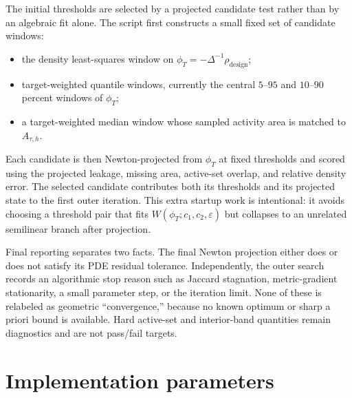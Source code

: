\documentclass[11pt]{article}
\begin{document}
The initial thresholds are selected by a projected candidate test rather than
by an algebraic fit alone.  The script first constructs a small fixed set of
candidate windows:
\begin{itemize}[leftmargin=2em]
\item the density least-squares window on $\phi_T=-\Delta^{-1}\rho_{\mathrm{design}}$;
\item target-weighted quantile windows, currently the central $5$--$95$ and
$10$--$90$ percent windows of $\phi_T$;
\item a target-weighted median window whose sampled activity area is matched
to $A_{\tau,h}$.
\end{itemize}
Each candidate is then Newton-projected from $\phi_T$ at fixed thresholds and
scored using the projected leakage, missing area, active-set overlap, and
relative density error.  The selected candidate contributes both its thresholds
and its projected state to the first outer iteration.  This extra startup work
is intentional: it avoids choosing a threshold pair that fits
$W(\phi_T;c_1,c_2,\varepsilon)$ but collapses to an unrelated semilinear branch
after projection.

Final reporting separates two facts.  The final Newton projection either does
or does not satisfy its PDE residual tolerance.  Independently, the outer
search records an algorithmic stop reason such as Jaccard stagnation,
metric-gradient stationarity, a small parameter step, or the iteration
limit.  None of these is relabeled as geometric ``convergence,'' because no
known optimum or sharp a priori bound is available.  Hard active-set and
interior-band quantities remain diagnostics and are not pass/fail targets.

\section{Implementation parameters}
\end{document}
